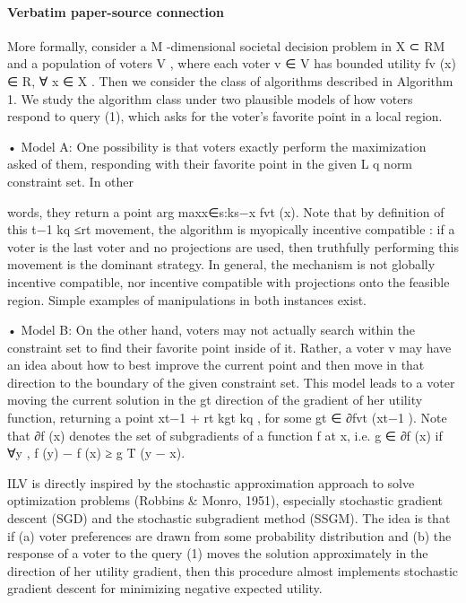 \documentclass[10pt]{article}
\begin{document}
\paragraph{Verbatim paper-source connection}
\begin{ReviewVerbatim}
More formally, consider a M -dimensional societal decision problem in X  ⊂ RM and a
population of voters V , where each voter v ∈ V has bounded utility fv (x) ∈ R, ∀ x ∈ X .
Then we consider the class of algorithms described in Algorithm 1. We study the algorithm
class under two plausible models of how voters respond to query (1), which asks for the
voter's favorite point in a local region.



• Model A:       One possibility is that voters exactly perform the maximization asked of
  them, responding with their favorite point in the given L
                                                                       q norm constraint set. In other

  words, they return a point arg maxx∈{s:ks−x                    fvt (x). Note that by definition of this
                                                  t−1 kq ≤rt }
  movement, the algorithm is     myopically incentive compatible : if a voter is the last voter
  and no projections are used, then truthfully performing this movement is the dominant
  strategy.   In general, the mechanism is not globally incentive compatible, nor incentive
  compatible with projections onto the feasible region. Simple examples of manipulations
  in both instances exist.



• Model B:       On the other hand, voters may not actually search within the constraint set
  to find their favorite point inside of it. Rather, a voter v may have an idea about how
  to best improve the current point and then move in that direction to the boundary of
  the given constraint set. This model leads to a voter moving the current solution in the
                                                                                           gt
  direction of the gradient of her utility function, returning a point xt−1 + rt
                                                                                         kgt kq , for some
  gt ∈ ∂fvt (xt−1 ). Note that ∂f (x) denotes the set of subgradients of a function f at x, i.e.
  g ∈ ∂f (x) if ∀y , f (y) − f (x) ≥ g T (y − x).

   ILV is directly inspired by the stochastic approximation approach to solve optimization
problems (Robbins & Monro, 1951), especially stochastic gradient descent (SGD) and the
stochastic subgradient method (SSGM). The idea is that if (a) voter preferences are drawn
from some probability distribution and (b) the response of a voter to the query (1) moves the
solution approximately in the direction of her utility gradient, then this procedure              almost
implements stochastic gradient descent for minimizing negative expected utility.


\end{ReviewVerbatim}
\end{document}
